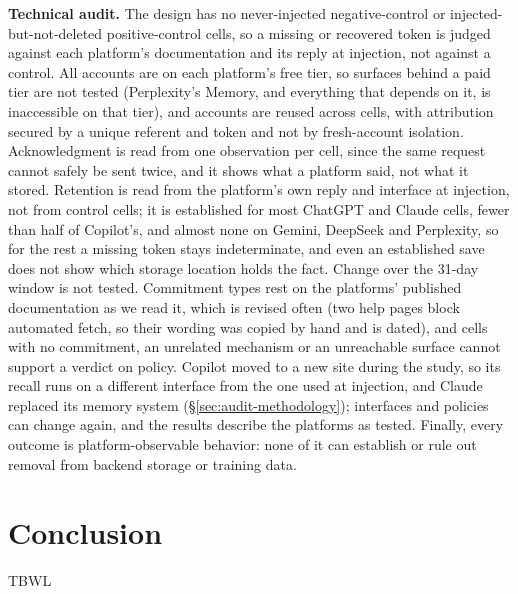 \documentclass[conference,compsoc]{IEEEtran}
\begin{document}
\textbf{Technical audit.} The design has no never-injected negative-control or
injected-but-not-deleted positive-control cells, so a missing or recovered
token is judged against each platform's documentation and its reply at
injection, not against a control. All accounts are on each platform's free
tier, so surfaces behind a paid tier are not tested (Perplexity's Memory, and
everything that depends on it, is inaccessible on that tier), and accounts are
reused across cells, with attribution secured by a unique referent and token
and not by fresh-account isolation. Acknowledgment is read from one
observation per cell, since the same request cannot safely be sent twice, and
it shows what a platform said, not what it stored. Retention is read from the
platform's own reply and interface at injection, not from control cells; it is
established for most ChatGPT and Claude cells, fewer than half of Copilot's, and
almost none on Gemini, DeepSeek and Perplexity, so for the rest a missing token
stays indeterminate, and even an established save does not show which storage
location holds the fact. Change over the 31-day window is not tested. Commitment
types rest on the platforms' published documentation as we read it, which is
revised often (two help pages block automated fetch, so their wording was
copied by hand and is dated), and cells with no commitment, an unrelated
mechanism or an unreachable surface cannot support a verdict on policy. Copilot moved
to a new site during the study, so its recall runs on a different interface
from the one used at injection, and Claude replaced its memory system
(\S\ref{sec:audit-methodology}); interfaces and policies can change again, and
the results describe the platforms as tested. Finally, every outcome is
platform-observable behavior: none of it can establish or rule out removal from
backend storage or training data.





\section{Conclusion}
TBWL
\end{document}
